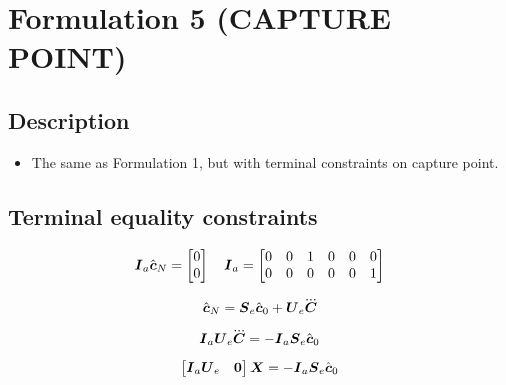 \section{Formulation 5 (CAPTURE POINT)}\label{sec.form05}


\subsection{Description}
\begin{itemize}
    \item The same as Formulation 1, but with terminal constraints on capture point.
\end{itemize}



\subsection{Terminal equality constraints}
\begin{equation*}
    \mbox{\boldmath $I$}_{a} \hat{\mbox{\boldmath $c$}}_N =
        \begin{bmatrix}
            0 \\
            0 \\
        \end{bmatrix}
    \quad
    \mbox{\boldmath $I$}_{a} =
        \begin{bmatrix}
            0 & 0 & 1 & 0 & 0 & 0 \\
            0 & 0 & 0 & 0 & 0 & 1 \\
        \end{bmatrix}
\end{equation*}

\begin{equation*}
    \cstate_N = \M{S}_e \cstate_0     +   \M{U}_e \cJerk
\end{equation*}

\begin{equation*}
    \M{I}_{a} \M{U}_e \cJerk = - \M{I}_{a} \M{S}_e \cstate_0
\end{equation*}

\begin{equation*}
    \begin{bmatrix}
        \mbox{\boldmath $I$}_{a} \mbox{\boldmath $U$}_e  & \mbox{\boldmath $0$}\\
    \end{bmatrix}
    \mbox{\boldmath $X$} 
    = 
    - \mbox{\boldmath $I$}_{a} \mbox{\boldmath $S$}_e \hat{\mbox{\boldmath $c$}}_0
\end{equation*}


